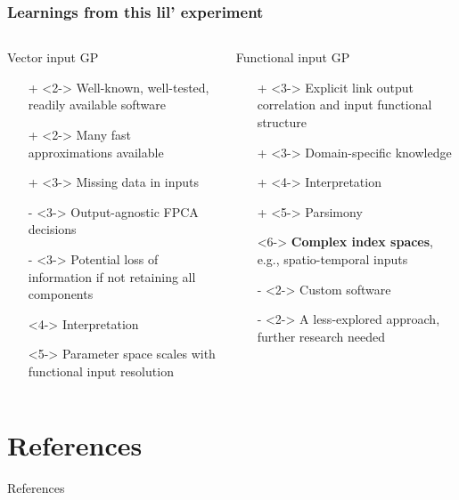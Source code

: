 \documentclass[aspectratio=169,t]{beamer}
\begin{document}
\begin{frame}
  \frametitle{Learnings from this lil' experiment}

  \small
 
  \begin{columns}[t]
    \begin{column}{.45\textwidth}
      Vector input GP
      \begin{itemize}
      \item[+]<2-> Well-known, well-tested, readily available software
      \item[+]<2-> Many fast approximations available
      \item[+]<3-> Missing data in inputs
      \end{itemize}
      \vspace{0.25cm}
      \begin{itemize}
      \item[-]<3-> Output-agnostic FPCA decisions%
      \item[-]<3-> Potential loss of information if not retaining all
        components
      \item[\emoji{monocle-face}]<4-> Interpretation
      \item[\emoji{worried-face}]<5-> Parameter space scales with
        functional input resolution
      \end{itemize}
    \end{column}

    \begin{column}{.45\textwidth}
      Functional input GP
      \begin{itemize}
      \item[+]<3-> Explicit link output correlation and
        input functional structure
      \item[+]<3-> Domain-specific knowledge
      \item[+]<4-> Interpretation
      \item[+]<5-> Parsimony
      \item[\emoji{winking-face}]<6-> \alert{\textbf{Complex index spaces}},
        e.g., spatio-temporal inputs
      \end{itemize}
      \vspace{0.25cm}
      \begin{itemize}
      \item[-]<2-> Custom software
      \item[-]<2-> A less-explored approach, further research needed
      \end{itemize}
    \end{column}
  \end{columns}
  
\end{frame}

\section{References}

\begin{frame}{References}
  \tiny
  
  
\end{frame}
\end{document}
